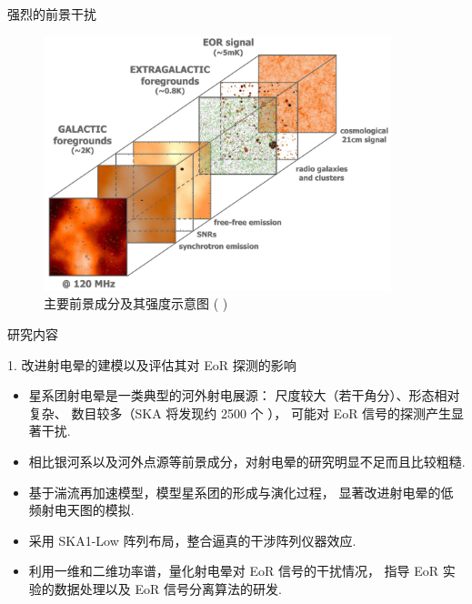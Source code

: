 \documentclass{beamer}
\newcommand{\citeay}[1]{\citeauthor{#1} \citeyear{#1} \parencite{#1}}
\begin{document}
\begin{frame}{强烈的前景干扰}
  \begin{figure}
    \centering
    \includegraphics[width=0.9\textwidth]{eor-foregrounds}
    \caption{主要前景成分及其强度示意图 (\citeay{zaroubi2013})}
  \end{figure}
\end{frame}

\begin{frame}{研究内容}
  \begin{alertblock}{1. 改进射电晕的建模以及评估其对 EoR 探测的影响}
    \begin{itemize}
      \item 星系团射电晕是一类典型的河外射电展源：
        尺度较大（若干角分）、形态相对复杂、
        数目较多（SKA 将发现约 2500 个 \cite{cassano2015}），
        可能对 EoR 信号的探测产生显著干扰.
      \item 相比银河系以及河外点源等前景成分，对射电晕的研究明显不足而且比较粗糙.
      \item 基于\alert{湍流再加速模型}，模型星系团的形成与演化过程，
        显著改进射电晕的低频射电天图的模拟.
      \item 采用 \alert{SKA1-Low 阵列布局}，整合逼真的干涉阵列仪器效应.
      \item 利用一维和二维功率谱，量化射电晕对 EoR 信号的干扰情况，
        指导 EoR 实验的数据处理以及 EoR 信号分离算法的研发.
    \end{itemize}
  \end{alertblock}
\end{frame}
\end{document}
